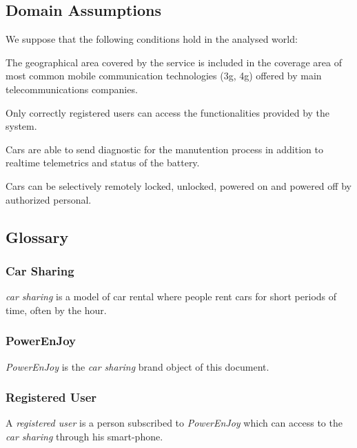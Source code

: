\documentclass[english]{article}
\newcommand{\carsharing}{\textit {car sharing }}
\newcommand{\powerenjoy}{\textit{PowerEnJoy }}
\newcommand{\registereduser}{\textit {registered user }}
\newcommand{\powerenjoy}[0]{{PowerEnjoy }}
\begin{document}
	\subsection{Domain Assumptions }
	We suppose that the following conditions hold in the analysed world:
	\begin{description}
		

		\item [D.1]{ The geographical area covered by the service is included in the coverage area of most common mobile communication technologies (3g, 4g) offered by main telecommunications companies. }
		\item [D.2]{ Only correctly registered users can access the functionalities provided by the system. }
		\item [D.3]{ Cars are able to send diagnostic for the manutention process in addition to realtime telemetrics and status of the battery.  }
		\item [D.]{ Cars can be selectively remotely locked, unlocked, powered on and powered off by authorized personal. }
		\item [D.]{  }
		\item [D.]{  }
		\item [D.]{  }
		\item [D.]{  }
		\item [D.]{  }
		\item [D.]{  }	

	\end{description}

	\subsection{Glossary}
		\subsubsection{Car Sharing}
			\carsharing is a model of car rental where people rent cars for short periods of time, often by the hour.
		\subsubsection{PowerEnJoy}
			\powerenjoy is the \carsharing brand object of this document. 
		\subsubsection{Registered User}
			A \registereduser is a person subscribed to \powerenjoy which can access to the \carsharing through his smart-phone.
\end{document}
